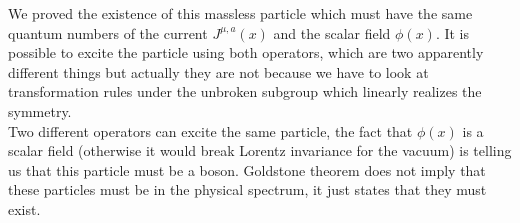 \documentclass[../main.tex]{subfiles}
\begin{document}
We proved the existence of this massless particle which must have the same quantum numbers of the current $J^{\mu,a}(x)$ and the scalar field $\phi(x)$. It is possible to excite the particle using both operators, which are two apparently different things but actually they are not because we have to look at transformation rules under the unbroken subgroup which linearly realizes the symmetry.\\
Two different operators can excite the same particle, the fact that $\phi(x)$ is a scalar field (otherwise it would break Lorentz invariance for the vacuum) is telling us that this particle must be a boson. 
Goldstone theorem does not imply that these particles must be in the physical spectrum, it just states that they must exist.\\
\end{document}
